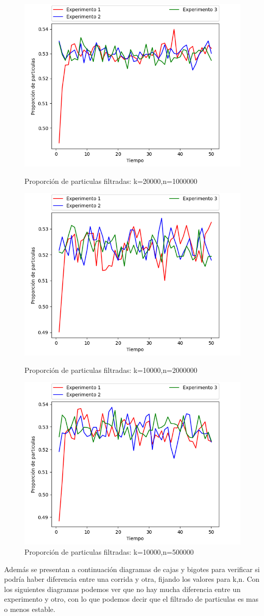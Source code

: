 \documentclass{article}
\begin{document}
		\newpage
	\begin{figure}[h!]
				\centering
	\includegraphics[width=0.5\linewidth]{Figure_3.png}
	\caption{Proporción de particulas filtradas: k=20000,n=1000000}
	\label{fig:imagen4}

	\includegraphics[width=0.5\linewidth]{Figure_4.png}
	\caption{Proporción de particulas filtradas: k=10000,n=2000000}
	\label{fig:imagen5}

	\includegraphics[width=0.5\linewidth]{Figure_5.png}
	\caption{Proporción de particulas filtradas: k=10000,n=500000}
	\label{fig:imagen6}
	
\end{figure}

Además se presentan a continuación diagramas de cajas y bigotes para verificar si podría haber diferencia entre una corrida y otra, fijando los valores para k,n. Con los siguientes diagramas podemos ver que no hay mucha diferencia entre un experimento y otro, con lo que podemos decir que el filtrado de particulas es mas o menos estable.
\end{document}
